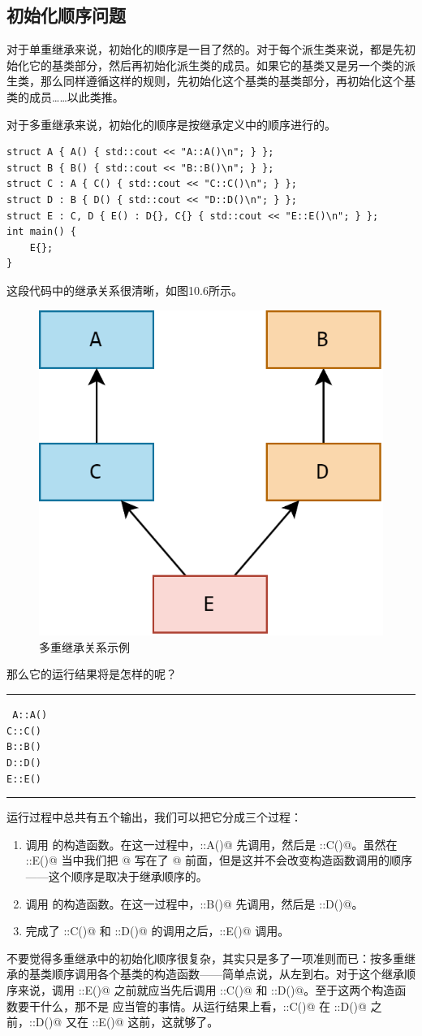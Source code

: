 \subsection*{初始化顺序问题}
对于单重继承来说，初始化的顺序是一目了然的。对于每个派生类来说，都是先初始化它的基类部分，然后再初始化派生类的成员。如果它的基类又是另一个类的派生类，那么同样遵循这样的规则，先初始化这个基类的基类部分，再初始化这个基类的成员……以此类推。\par
对于多重继承来说，初始化的顺序是按继承定义中的顺序进行的。
\begin{lstlisting}
struct A { A() { std::cout << "A::A()\n"; } };
struct B { B() { std::cout << "B::B()\n"; } };
struct C : A { C() { std::cout << "C::C()\n"; } };
struct D : B { D() { std::cout << "D::D()\n"; } };
struct E : C, D { E() : D{}, C{} { std::cout << "E::E()\n"; } };
int main() {
    E{};
}
\end{lstlisting}
这段代码中的继承关系很清晰，如图10.6所示。
\begin{figure}[htbp]
    \centering
    \includegraphics[width=.36\textwidth]{../images/generalized_parts/10_multiple_inheritance_example_300.png}
    \caption{多重继承关系示例}
\end{figure}
那么它的运行结果将是怎样的呢？\\\noindent\rule{\linewidth}{.2pt}\texttt{
A::A()\\
C::C()\\
B::B()\\
D::D()\\
E::E()
}\\\noindent\rule{\linewidth}{.2pt}
运行过程中总共有五个输出，我们可以把它分成三个过程：
\begin{enumerate}
    \item 调用 \lstinline@C@ 的构造函数。在这一过程中，\lstinline@A::A()@ 先调用，然后是 \lstinline@C::C()@。虽然在 \lstinline@E::E()@ 当中我们把 \lstinline@D{}@ 写在了 \lstinline@C{}@ 前面，但是这并不会改变构造函数调用的顺序——这个顺序是取决于继承顺序的。
    \item 调用 \lstinline@D@ 的构造函数。在这一过程中，\lstinline@B::B()@ 先调用，然后是 \lstinline@D::D()@。
    \item 完成了 \lstinline@C::C()@ 和 \lstinline@D::D()@ 的调用之后，\lstinline@E::E()@ 调用。
\end{enumerate}
不要觉得多重继承中的初始化顺序很复杂，其实只是多了一项准则而已：按多重继承的基类顺序调用各个基类的构造函数——简单点说，从左到右。对于这个继承顺序来说，调用 \lstinline@E::E()@ 之前就应当先后调用 \lstinline@C::C()@ 和 \lstinline@D::D()@。至于这两个构造函数要干什么，那不是 \lstinline@E@ 应当管的事情。从运行结果上看，\lstinline@C::C()@ 在 \lstinline@D::D()@ 之前，\lstinline@D::D()@ 又在 \lstinline@E::E()@ 这前，这就够了。\par
